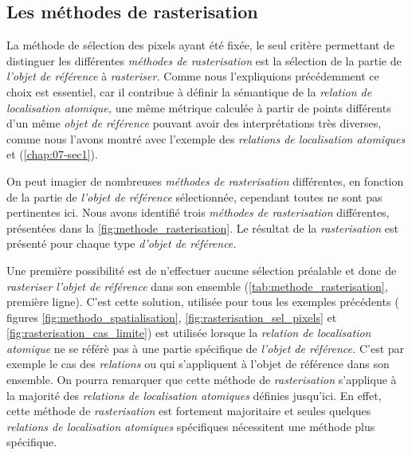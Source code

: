 \subsection{Les méthodes de rasterisation}

La méthode de sélection des pixels ayant été fixée, le seul critère
permettant de distinguer les différentes \emph{méthodes de
  rasterisation} est la sélection de la partie de \emph{l'objet de
  référence} à \emph{rasteriser.} Comme nous l'expliquions
précédemment ce choix est essentiel, car il contribue à définir la
sémantique de la \emph{relation de localisation atomique,} une même
métrique calculée à partir de points différents d'un même \emph{objet
  de référence} pouvant avoir des interprétations très diverses, comme
nous l'avons montré avec l'exemple des \emph{relations de localisation
  atomiques}  et
 (\autoref{chap:07-sec1}).

On peut imagier de nombreuses \emph{méthodes de rasterisation}
différentes, en fonction de la partie de \emph{l'objet de référence}
sélectionnée, cependant toutes ne sont pas pertinentes ici. Nous avons
identifié trois \emph{méthodes de rasterisation} différentes,
présentées dans la \ref{fig:methode_rasterisation}. Le résultat de la
\emph{rasterisation} est présenté pour chaque type \emph{d'objet de
  référence.}

Une première possibilité est de n'effectuer aucune sélection préalable
et donc de \emph{rasteriser} \emph{l'objet de référence} dans son
ensemble (\autoref{tab:methode_rasterisation}, première ligne). C'est
cette solution, utilisée pour tous les exemples précédents (\ie
figures \ref{fig:methodo_spatialisation},
\ref{fig:rasterisation_sel_pixels} et
\ref{fig:rasterisation_cas_limite}) est utilisée lorsque la
\emph{relation de localisation atomique} ne se référè pas à une partie
spécifique de \emph{l'objet de référence.} C'est par exemple le cas
des \emph{relations}  ou 
qui s'appliquent à l'objet de référence dans son ensemble. On pourra
remarquer que cette méthode de \emph{rasterisation} s'applique à la
majorité des \emph{relations de localisation atomiques} définies
jusqu'ici. En effet, cette méthode de \emph{rasterisation} est
fortement majoritaire et seules quelques \emph{relations de
  localisation atomiques} spécifiques nécessitent une méthode plus
spécifique.

